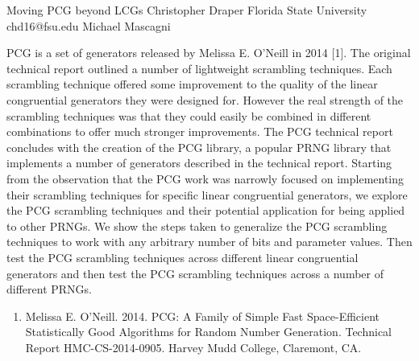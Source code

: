 \begin{talk}
  {Moving PCG beyond LCGs}%
  {Christopher Draper}%
  {Florida State University}%
  {chd16@fsu.edu}%
  { Michael Mascagni}%
  
    
   
PCG is a set of generators released by Melissa E. O’Neill in 2014 [1]. The original technical report outlined a number of lightweight
scrambling techniques. Each scrambling technique offered some improvement to the quality of the linear congruential generators
they were designed for. However the real strength of the scrambling techniques was that they could easily be combined in different
combinations to offer much stronger improvements. The PCG technical report concludes with the creation of the PCG library, a
popular PRNG library that implements a number of generators described in the technical report. Starting from the observation that the
PCG work was narrowly focused on implementing their scrambling techniques for specific linear congruential generators, we explore
the PCG scrambling techniques and their potential application for being applied to other PRNGs. We show the steps taken to generalize the PCG
scrambling techniques to work with any arbitrary number of bits and parameter values. Then test the PCG scrambling techniques
across different linear congruential generators and then test the PCG scrambling techniques across a number of different PRNGs.
\medskip

\begin{enumerate}
 \item[{[1]}] Melissa E. O’Neill. 2014. PCG: A Family of Simple Fast Space-Efficient Statistically Good Algorithms for Random Number Generation. Technical Report HMC-CS-2014-0905. Harvey Mudd College, Claremont, CA.
\end{enumerate}

\end{talk}

